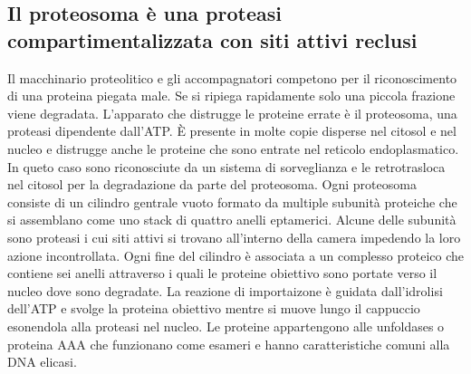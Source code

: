 \subsection{Il proteosoma \`e una proteasi compartimentalizzata con siti attivi reclusi}
Il macchinario proteolitico e gli accompagnatori competono per il riconoscimento di una proteina piegata male. Se si ripiega rapidamente solo una piccola frazione viene degradata. 
L'apparato che distrugge le proteine errate \`e il proteosoma, una proteasi dipendente dall'ATP. \`E presente in molte copie disperse nel citosol e nel nucleo e distrugge anche le 
proteine che sono entrate nel reticolo endoplasmatico. In queto caso sono riconosciute da un sistema di sorveglianza e le retrotrasloca nel citosol per la degradazione da parte del
proteosoma. Ogni proteosoma consiste di un cilindro gentrale vuoto formato da multiple subunit\`a proteiche che si assemblano come uno stack di quattro anelli eptamerici. Alcune delle
subunit\`a sono proteasi i cui siti attivi si trovano all'interno della camera impedendo la loro azione incontrollata. Ogni fine del cilindro \`e associata a un complesso proteico che
contiene sei anelli attraverso i quali le proteine obiettivo sono portate verso il nucleo dove sono degradate. La reazione di importaizone \`e guidata dall'idrolisi dell'ATP e svolge
la proteina obiettivo mentre si muove lungo il cappuccio esonendola alla proteasi nel nucleo. Le proteine appartengono alle unfoldases o proteina AAA che funzionano come esameri
e hanno caratteristiche comuni alla DNA elicasi. 
